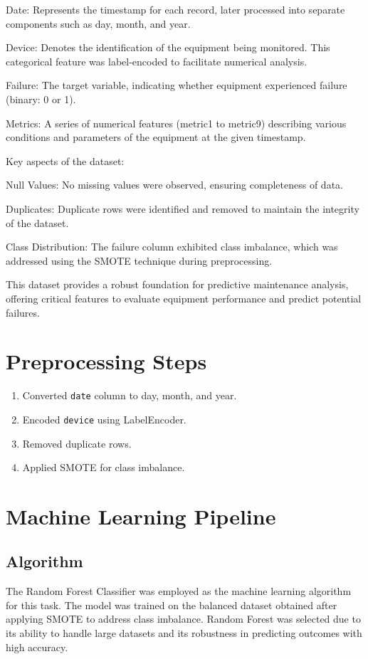 	Date: Represents the timestamp for each record, later processed into separate components such as day, month, and year.
	
	Device: Denotes the identification of the equipment being monitored. This categorical feature was label-encoded to facilitate numerical analysis.
	
	Failure: The target variable, indicating whether equipment experienced failure (binary: 0 or 1).
	
	Metrics: A series of numerical features (metric1 to metric9) describing various conditions and parameters of the equipment at the given timestamp.
	
	Key aspects of the dataset:
	
	Null Values: No missing values were observed, ensuring completeness of data.
	
	Duplicates: Duplicate rows were identified and removed to maintain the integrity of the dataset.
	
	Class Distribution: The failure column exhibited class imbalance, which was addressed using the SMOTE technique during preprocessing.
	
	This dataset provides a robust foundation for predictive maintenance analysis, offering critical features to evaluate equipment performance and predict potential failures.
	
	\section{Preprocessing Steps}
	\begin{enumerate}
		\item Converted \texttt{date} column to day, month, and year.
		\item Encoded \texttt{device} using LabelEncoder.
		\item Removed duplicate rows.
		\item Applied SMOTE for class imbalance.
	\end{enumerate}
	
	\section{Machine Learning Pipeline}
	\subsection{Algorithm}
	The Random Forest Classifier was employed as the machine learning algorithm for this task. The model was trained on the balanced dataset obtained after applying SMOTE to address class imbalance. Random Forest was selected due to its ability to handle large datasets and its robustness in predicting outcomes with high accuracy.
	
